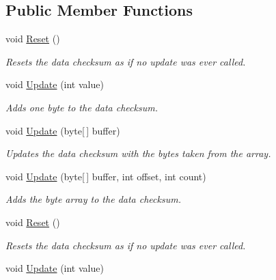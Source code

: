 \subsection*{Public Member Functions}
\begin{DoxyCompactItemize}
\item 
void \hyperlink{interface_i_c_sharp_code_1_1_sharp_zip_lib_1_1_checksums_1_1_i_checksum_a43ef0e6e9e22a503da94790835a0a384}{Reset} ()
\begin{DoxyCompactList}\small\item\em Resets the data checksum as if no update was ever called. \end{DoxyCompactList}\item 
void \hyperlink{interface_i_c_sharp_code_1_1_sharp_zip_lib_1_1_checksums_1_1_i_checksum_a060abf360d877d0d9cf503fa6d6873d0}{Update} (int value)
\begin{DoxyCompactList}\small\item\em Adds one byte to the data checksum. \end{DoxyCompactList}\item 
void \hyperlink{interface_i_c_sharp_code_1_1_sharp_zip_lib_1_1_checksums_1_1_i_checksum_aee26d2b3705b22ab24cc9b5eb9dbc81d}{Update} (byte\mbox{[}$\,$\mbox{]} buffer)
\begin{DoxyCompactList}\small\item\em Updates the data checksum with the bytes taken from the array. \end{DoxyCompactList}\item 
void \hyperlink{interface_i_c_sharp_code_1_1_sharp_zip_lib_1_1_checksums_1_1_i_checksum_ae9f746b719a279125fd42e4d89f198dd}{Update} (byte\mbox{[}$\,$\mbox{]} buffer, int offset, int count)
\begin{DoxyCompactList}\small\item\em Adds the byte array to the data checksum. \end{DoxyCompactList}\item 
void \hyperlink{interface_i_c_sharp_code_1_1_sharp_zip_lib_1_1_checksums_1_1_i_checksum_a43ef0e6e9e22a503da94790835a0a384}{Reset} ()
\begin{DoxyCompactList}\small\item\em Resets the data checksum as if no update was ever called. \end{DoxyCompactList}\item 
void \hyperlink{interface_i_c_sharp_code_1_1_sharp_zip_lib_1_1_checksums_1_1_i_checksum_a060abf360d877d0d9cf503fa6d6873d0}{Update} (int value)

\end{DoxyCompactItemize}
